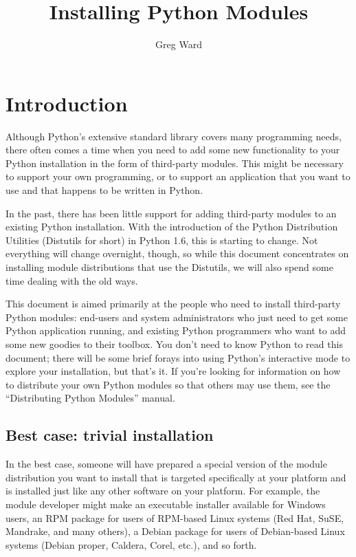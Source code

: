 \documentclass{howto}
\title{Installing Python Modules}
\author{Greg Ward}
\begin{document}
\maketitle


\tableofcontents

\section{Introduction}
\label{sec:intro}

Although Python's extensive standard library covers many programming
needs, there often comes a time when you need to add some new
functionality to your Python installation in the form of third-party
modules.  This might be necessary to support your own programming, or to
support an application that you want to use and that happens to be
written in Python.

In the past, there has been little support for adding third-party
modules to an existing Python installation.  With the introduction of
the Python Distribution Utilities (Distutils for short) in Python 1.6,
this is starting to change.  Not everything will change overnight,
though, so while this document concentrates on installing module
distributions that use the Distutils, we will also spend some time
dealing with the old ways.

This document is aimed primarily at the people who need to install
third-party Python modules: end-users and system administrators who just
need to get some Python application running, and existing Python
programmers who want to add some new goodies to their toolbox.  You
don't need to know Python to read this document; there will be some
brief forays into using Python's interactive mode to explore your
installation, but that's it.  If you're looking for information on how
to distribute your own Python modules so that others may use them, see
the ``Distributing Python Modules'' manual.


\subsection{Best case: trivial installation}
\label{sec:trivial-inst}

In the best case, someone will have prepared a special version of the
module distribution you want to install that is targeted specifically at
your platform and is installed just like any other software on your
platform.  For example, the module developer might make an executable
installer available for Windows users, an RPM package for users of
RPM-based Linux systems (Red Hat, SuSE, Mandrake, and many others), a
Debian package for users of Debian-based Linux systems (Debian proper,
Caldera, Corel, etc.), and so forth.
\end{document}
